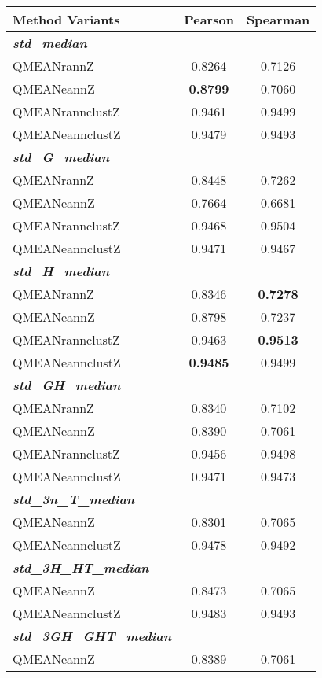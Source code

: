 \begin{table}[htbp]
\center
\begin{tabular}{lcc}
\toprule                %
\textbf{Method Variants} & \textbf{Pearson} & \textbf{Spearman} \\
	\midrule                %
	\emph{\textbf{std\_median}} & &\\
	QMEANrannZ	&0.8264	&0.7126\\
	QMEANeannZ	&\textbf{0.8799}	&0.7060\\
	QMEANrannclustZ	&0.9461	&0.9499\\
	QMEANeannclustZ	&0.9479	&0.9493\\
	\midrule                %
	\emph{\textbf{std\_G\_median}}	 & &\\
	QMEANrannZ	&0.8448	&0.7262\\
	QMEANeannZ	&0.7664	&0.6681\\
	QMEANrannclustZ	&0.9468	&0.9504\\
	QMEANeannclustZ	&0.9471	&0.9467\\
	\midrule                %
	\emph{\textbf{std\_H\_median}}	& &\\
	QMEANrannZ	&0.8346	&\textbf{0.7278}\\
	QMEANeannZ	&0.8798	&0.7237\\
	QMEANrannclustZ	&0.9463	&\textbf{0.9513}\\
	QMEANeannclustZ	&\textbf{0.9485}	&0.9499\\	
	\midrule                %
	\emph{\textbf{std\_GH\_median}}	& &\\
	QMEANrannZ	&0.8340	&0.7102\\
	QMEANeannZ	&0.8390	&0.7061\\
	QMEANrannclustZ	&0.9456	&0.9498\\
	QMEANeannclustZ	&0.9471	&0.9473\\	
	\midrule                %
	\emph{\textbf{std\_3n\_T\_median}}	& &\\
	QMEANeannZ	&0.8301	&0.7065\\
	QMEANeannclustZ	&0.9478	&0.9492\\	
	\midrule                %
	\emph{\textbf{std\_3H\_HT\_median}}	& &\\
	QMEANeannZ	&0.8473	&0.7065\\
	QMEANeannclustZ	&0.9483	&0.9493\\		
	\midrule                %
	\emph{\textbf{std\_3GH\_GHT\_median}}	& &\\
	QMEANeannZ	&0.8389	&0.7061\\

\end{tabular}
\end{table}
